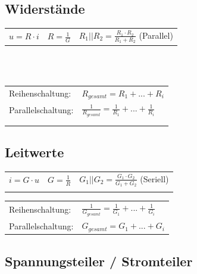 \documentclass[a4paper,twocolumn,10pt]{article}
\begin{document}
\subsection*{Widerstände}
\begin{tabular}{lll}
$u=R\cdot i$ & $R=\frac{1}{G}$ & $R_1||R_2 = \frac{R_1\cdot R_2}{R_1+R_2}$ (Parallel)
\end{tabular}\\\\
\begin{tabular}{ll}
Reihenschaltung: & $R_{gesamt}=R_1+...+R_i$\\
Parallelschaltung: & $\frac{1}{R_{gesamt}}=\frac{1}{R_1}+...+\frac{1}{R_i}$\\ & \\
& 
\end{tabular}

\subsection*{Leitwerte}
\begin{tabular}{lll}
$i=G\cdot u$ & $G=\frac{1}{R}$ & $G_1||G_2 = \frac{G_1\cdot G_2}{G_1+G_2}$ (Seriell)\\ & & \\
\end{tabular}
\begin{tabular}{ll}
Reihenschaltung: & $\frac{1}{G_{gesamt}}=\frac{1}{G_1}+...+\frac{1}{G_i}$\\
Parallelschaltung: & $G_{gesamt}=G_1+...+G_i$
\end{tabular}

\subsection*{Spannungsteiler / Stromteiler}
\end{document}

